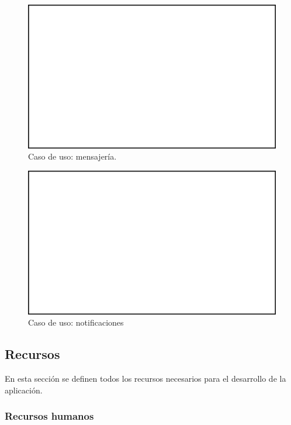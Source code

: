 \documentclass[a4paper, 12pt]{article}
\begin{document}
\begin{figure}[H]
	\begin{center}
		{\includegraphics[width=12cm]{White.png}\par}
		\caption{Caso de uso: mensajería.}
	\end{center}
\end{figure}

\begin{figure}[H]
	\begin{center}
		{\includegraphics[width=12cm]{White.png}\par}
		\caption{Caso de uso: notificaciones}
	\end{center}
\end{figure}




\subsection{Recursos}

En esta sección se definen todos los recursos necesarios para el desarrollo de la aplicación.

\subsubsection{Recursos humanos}
\end{document}
